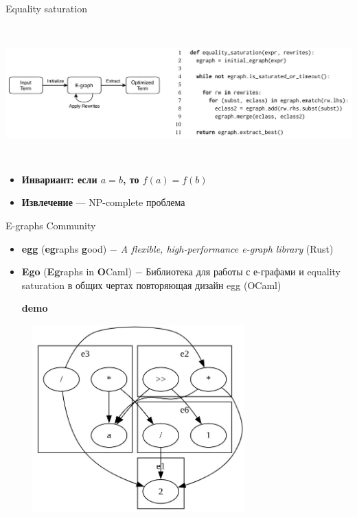 \documentclass[aspectratio=169
  , xcolor={svgnames}
  , russian  %
  ]{beamer}
\begin{document}
\begin{frame}{Equality saturation}
    \begin{center}
        \includegraphics[width=15.2cm, height=5.2cm]{misc/egraphs_images/equality_saturation1.jpeg} 
    \end{center}

    \begin{center}
       \begin{itemize}
           \item \textbf{Инвариант: если $a = b$, то $f(a) = f(b)$} \\
           \item \textbf{Извлечение} --- NP-complete проблема \\
       \end{itemize}
       
       
    \end{center}    
\end{frame}

\begin{frame}{E-graphs Community}
    \begin{itemize}
        \item \textbf{egg} (\textbf{eg}raphs \textbf{g}ood)\textit{ $-$ A flexible, high-performance e-graph library} (Rust)\newline
        \item \textbf{Ego} (\textbf{Eg}raphs in \textbf{O}Caml) $-$ Библиотека для работы с е-графами и equality saturation в общих чертах повторяющая дизайн egg (OCaml)\newline

        \textbf{demo}

    \end{itemize}
\end{frame}

\begin{frame}{}
    \centering
    \includegraphics[width=10.2cm, height=7.2cm]{misc/egraphs_images/demo_egraph.jpeg}
\end{frame}
\end{document}
